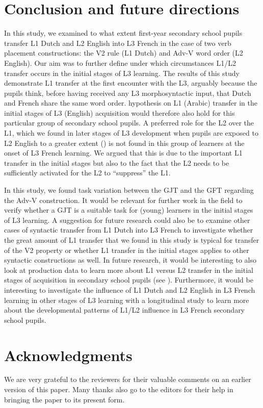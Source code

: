 \documentclass[output=paper]{langsci/langscibook}
\begin{document}
\section{Conclusion and future directions}
\label{sec:stadt:6}

In this study, we examined to what extent first-year secondary school pupils transfer L1 Dutch and L2 English into L3 French in the case of two verb placement constructions: the V2 rule (L1 Dutch) and Adv-V word order (L2 English). Our aim was to further define under which circumstances L1/L2 transfer occurs in the initial stages of L3 learning. The results of this study demonstrate L1 transfer at the first encounter with the L3, arguably because the pupils think, before having received any L3 morphosyntactic input, that Dutch and French share the same word order.  hypothesis on L1 (Arabic) transfer in the initial stages of L3 (English) acquisition would therefore also hold for this particular group of secondary school pupils. A preferred role for the L2 over the L1, which we found in later stages of L3 development when pupils are exposed to L2 English to a greater extent (\citealt{StadtEtAl2016, StadtEtAl2018Exposure}) is not found in this group of learners at the onset of L3 French learning. We argued that this is due to the important L1 transfer in the initial stages but also to the fact that the L2 needs to be sufficiently activated for the L2 to ``suppress'' the L1.

In this study, we found task variation between the GJT and the GFT regarding the Adv-V construction. It would be relevant for further work in the field to verify whether a GJT is a suitable task for (young) learners in the initial stages of L3 learning. A suggestion for future research could also be to examine other cases of syntactic transfer from L1 Dutch into L3 French to investigate whether the great amount of L1 transfer that we found in this study is typical for transfer of the V2 property or whether L1 transfer in the initial stages applies to other syntactic constructions as well. In future research, it would be interesting to also look at production data to learn more about L1 versus L2 transfer in the initial stages of acquisition in secondary school pupils (see \citealt{FalkEtAl2015}). Furthermore, it would be interesting to investigate the influence of L1 Dutch and L2 English in L3 French learning in other stages of L3 learning with a longitudinal study to learn more about the developmental patterns of L1/L2 influence in L3 French secondary school pupils.

\section*{Acknowledgments}

We are very grateful to the reviewers for their valuable comments on an earlier version of this paper. Many thanks also go to the editors for their help in bringing the paper to its present form.

{\sloppy\printbibliography[heading=subbibliography,notkeyword=this]}
\end{document}
